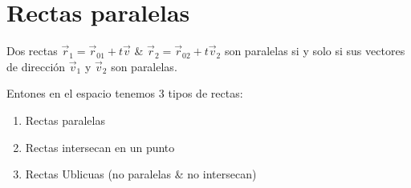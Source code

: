 \documentclass{article}
\begin{document}

\section{Rectas paralelas}
Dos rectas $\vec{r}_1 = \vec{r}_{01} + t \vec{v}$ \& $\vec{r}_{2} = \vec{r}_{02} + t \vec{v}_2 $ son paralelas si y solo si sus vectores de dirección $\vec{v}_1$ y $\vec{v}_2 $ son paralelas.
\begin{figure}[htbp]
    \centering
    \caption{}
    \label{}
\end{figure} 

Entones en el espacio tenemos 3 tipos de rectas:
\begin{enumerate}
    \item Rectas paralelas  
    \item Rectas intersecan en un punto
    \item Rectas Ublicuas (no paralelas \& no intersecan)
\end{enumerate}
\end{document}
